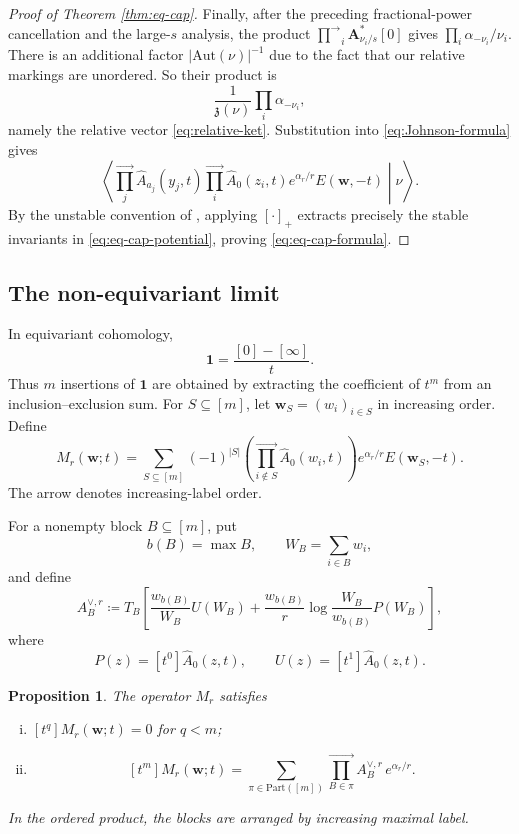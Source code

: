 \documentclass[letterpaper,12pt]{amsart}
\newtheorem{prop}[thm]{Proposition}
\theoremstyle{definition}
\newcommand{\id}{\mathbf 1}
\newcommand{\Aut}{\mathrm{Aut}}
\newcommand{\Part}{\mathrm{Part}}
\numberwithin{equation}{section}
\begin{document}
\begin{proof}[Proof of Theorem \ref{thm:eq-cap}]
Finally, after the preceding fractional-power cancellation and the large-$s$ analysis, the product \(\overrightarrow\prod_{i}\boldsymbol A^*_{\nu_i/s}[0]\) gives \(\prod_i\alpha_{-\nu_i}/\nu_i\). There is an additional factor \(|\Aut(\nu)|^{-1}\) due to the fact that our relative markings are unordered. So their product is
\[
 \frac{1}{\mathfrak z(\nu)}
 \prod_i\alpha_{-\nu_i},
\]
namely the relative vector \eqref{eq:relative-ket}. Substitution into
\eqref{eq:Johnson-formula} gives
\[
  \left\langle
  \overrightarrow{\prod_j}\widehat A_{a_j}(y_j,t)
  \overrightarrow{\prod_i}\widehat A_0(z_i,t)
  e^{\alpha_r/r}
  E(\mathbf w,-t)
  \middle|\nu\right\rangle.
\]
By the unstable convention of
\cite{J}, applying
\([\cdot]_{+}\) extracts precisely
the stable invariants in \eqref{eq:eq-cap-potential}, proving
\eqref{eq:eq-cap-formula}.

\end{proof}


\subsection{The non-equivariant limit}

In equivariant cohomology,
\[
 \id=\frac{[0]-[\infty]}{t}.
\]
Thus \(m\) insertions of \(\id\) are obtained by extracting the coefficient
of \(t^m\) from an inclusion--exclusion sum.  For \(S\subseteq[m]\), let
\(\mathbf w_S=(w_i)_{i\in S}\) in increasing order.  Define
\[
  M_r(\mathbf w;t)
  =
  \sum_{S\subseteq[m]}(-1)^{|S|}
  \left(\overrightarrow{\prod_{i\notin S}}\widehat A_0(w_i,t)\right)
  e^{\alpha_r/r}E(\mathbf w_S,-t).
\]
The arrow denotes increasing-label order.

For a nonempty block \(B\subseteq[m]\), put
\[
  b(B)=\max B,
  \qquad
  W_B=\sum_{i\in B}w_i,
\]
and define
\[
  A_B^{\vee,r}
  \coloneqq
  T_B\left[
    \frac{w_{b(B)}}{W_B}U(W_B)
    +
    \frac{w_{b(B)}}{r}
    \log\frac{W_B}{w_{b(B)}}P(W_B)
  \right],
\]
where
\[
  P(z)=[t^0]\widehat A_0(z,t),
  \qquad
  U(z)=[t^1]\widehat A_0(z,t).
\]


\begin{prop}\label{prop:M-redu}
The operator \(M_r\) satisfies
\begin{enumerate}[(i)]
\item \([t^q]M_r(\mathbf w;t)=0\) for \(q<m\);
\item
\[
  [t^m]M_r(\mathbf w;t)
  =
  \sum_{\pi\in\Part([m])}
  \overrightarrow{\prod_{B\in\pi}}A_B^{\vee,r}\,e^{\alpha_r/r}.
\]
\end{enumerate}
In the ordered product, the blocks are arranged by increasing maximal label.
\end{prop}
\end{document}
